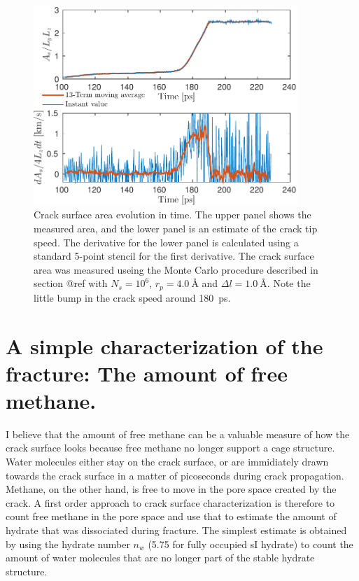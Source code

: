 \begin{figure}
\centering
\includegraphics[width=10cm]{../figures/thesis/crack_area_evolution_1048.pdf}
\caption{Crack surface area evolution in time. The upper panel shows the measured area, and the lower panel is an estimate of the crack tip speed. The derivative for the lower panel is calculated using a standard 5-point stencil for the first derivative. The crack surface area was measured useing the Monte Carlo procedure described in section @ref with $N_s = 10^6$, $r_p = \SI{4.0}{\angstrom}$ and $\Delta l = \SI{1.0}{\angstrom}$. Note the little bump in the crack speed around \SI{180}{\pico\second}.}
\label{fig:crack_area_evolution_1048}
\end{figure}


\section{A simple characterization of the fracture: The amount of free methane.}
I believe that the amount of free methane can be a valuable measure of how the crack surface looks because free methane no longer support a cage structure. Water molecules either stay on the crack surface, or are immidiately drawn towards the crack surface in a matter of picoseconds during crack propagation. Methane, on the other hand, is free to move in the pore space created by the crack. A first order approach to crack surface characterization is therefore to count free methane in the pore space and use that to estimate the amount of hydrate that was dissociated during fracture. The simplest estimate is obtained by using the hydrate number $n_w$ (5.75 for fully occupied sI hydrate) to count the amount of water molecules that are no longer part of the stable hydrate structure. 

